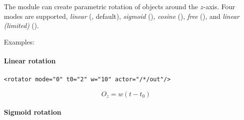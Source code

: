The  module can create parametric rotation of objects
around the $z$-axis. Four modes are supported, {\em linear}
(, default), {\em sigmoid} (), {\em
  cosine} (), {\em free} (), and {\em
  linear (limited)} ().


%



Examples:

\paragraph{Linear rotation}

\begin{lstlisting}[numbers=none]
  <rotator mode="0" t0="2" w="10" actor="/*/out"/>
\end{lstlisting}

\begin{equation}
O_z = w (t-t_0)
\end{equation}

\paragraph{Sigmoid rotation}

